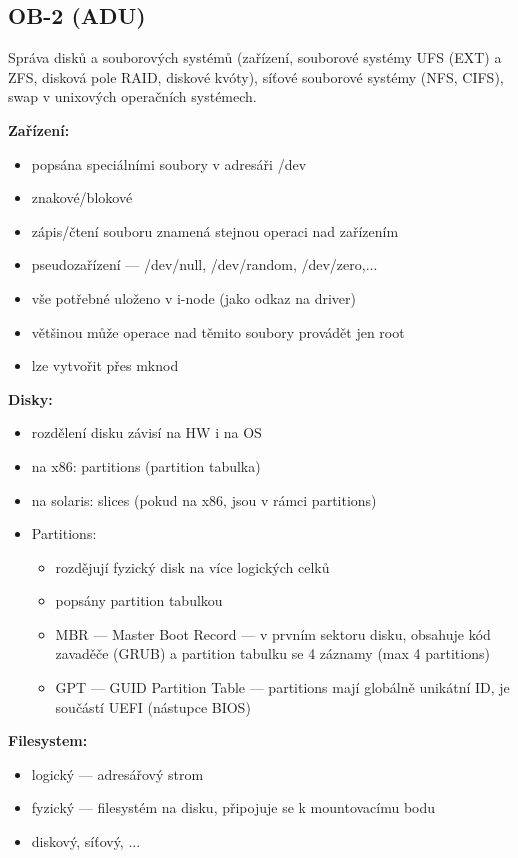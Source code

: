 \subsection{OB-2 (ADU)}
Správa disků a souborových systémů (zařízení, souborové systémy UFS (EXT) a ZFS, disková pole RAID, diskové kvóty), síťové souborové systémy (NFS, CIFS), swap v unixových operačních systémech.

\textbf{Zařízení:}
\begin{itemize}
    \item popsána speciálními soubory v adresáři /dev
    \item znakové/blokové
    \item zápis/čtení souboru znamená stejnou operaci nad zařízením
    \item pseudozařízení --- /dev/null, /dev/random, /dev/zero,...
    \item vše potřebné uloženo v i-node (jako odkaz na driver)
    \item většinou může operace nad těmito soubory provádět jen root
    \item lze vytvořit přes mknod
\end{itemize}

\textbf{Disky:}
\begin{itemize}
    \item rozdělení disku závisí na HW i na OS
    \item na x86: partitions (partition tabulka)
    \item na solaris: slices (pokud na x86, jsou v rámci partitions)
    \item Partitions:
    \begin{itemize}
        \item rozdějují fyzický disk na více logických celků
        \item popsány partition tabulkou
        \item MBR --- Master Boot Record --- v prvním sektoru disku, obsahuje kód zavaděče (GRUB) a partition tabulku se 4 záznamy (max 4 partitions)
        \item GPT --- GUID Partition Table --- partitions mají globálně unikátní ID, je součástí UEFI (nástupce BIOS)
    \end{itemize}
\end{itemize}

\textbf{Filesystem:}
\begin{itemize}
    \item logický --- adresářový strom
    \item fyzický --- filesystém na disku, připojuje se k mountovacímu bodu
    \item diskový, síťový, ...
\end{itemize}

